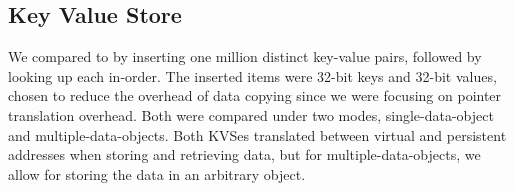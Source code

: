 {    \subsection{Key Value Store}
    \label{sec:kvperf}

    We compared \nvkv to \unixkv
    by inserting one
    million distinct key-value pairs, followed by looking up each in-order. The inserted items were 32-bit
    keys and 32-bit values, chosen to reduce the overhead of data copying since we were focusing on
    pointer translation overhead.
    Both were
    compared under two modes, single-data-object and multiple-data-objects. Both KVSes translated
    between virtual and persistent addresses when storing and retrieving data, but for
    multiple-data-objects, we allow for storing the data in an arbitrary object.

}
